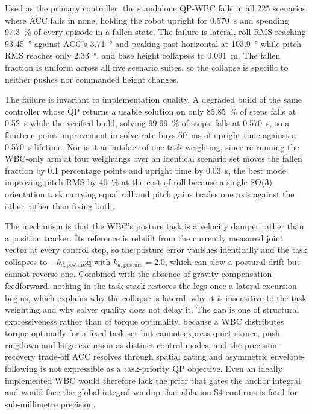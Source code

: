 \documentclass[a4paper,fleqn]{cas-dc}
\begin{document}
Used as the primary controller, the standalone QP-WBC falls in all \num{225}
scenarios where ACC falls in none, holding the robot upright for \SI{0.570}{s}
and spending \SI{97.3}{\percent} of every episode in a fallen state. The failure
is lateral, roll RMS reaching \SI{93.45}{\degree} against ACC's
\SI{3.71}{\degree} and peaking past horizontal at \SI{103.9}{\degree} while pitch
RMS reaches only \SI{2.33}{\degree}, and base height collapses to \SI{0.091}{m}.
The fallen fraction is uniform across all five scenario suites, so the collapse
is specific to neither pushes nor commanded height changes.

The failure is invariant to implementation quality. A degraded build of the same
controller whose QP returns a usable solution on only \SI{85.85}{\percent} of
steps falls at \SI{0.52}{s} while the verified build, solving
\SI{99.99}{\percent} of steps, falls at \SI{0.570}{s}, so a fourteen-point
improvement in solve rate buys \SI{50}{ms} of upright time against a
\SI{0.570}{s} lifetime. Nor is it an artifact of one task weighting, since
re-running the WBC-only arm at four weightings over an identical scenario set
moves the fallen fraction by \num{0.1} percentage points and upright time by
\SI{0.03}{s}, the best mode improving pitch RMS by \SI{40}{\percent} at the cost
of roll because a single SO(3) orientation task carrying equal roll and pitch
gains trades one axis against the other rather than fixing both.

The mechanism is that the WBC's posture task is a velocity damper rather than a
position tracker. Its reference is rebuilt from the currently measured joint
vector at every control step, so the posture error vanishes identically and the
task collapses to $-k_{d,\text{posture}}\dot{\mathbf{q}}$ with
$k_{d,\text{posture}}{=}2.0$, which can slow a postural drift but cannot reverse
one. Combined with the absence of gravity-compensation feedforward, nothing in
the task stack restores the legs once a lateral excursion begins, which explains
why the collapse is lateral, why it is insensitive to the task weighting and why
solver quality does not delay it. The gap is one of structural expressiveness
rather than of torque optimality, because a WBC distributes torque optimally for
a fixed task set but cannot express quiet stance, push ringdown and large
excursion as distinct control modes, and the precision--recovery trade-off ACC
resolves through spatial gating and asymmetric envelope-following is not
expressible as a task-priority QP objective. Even an ideally implemented WBC
would therefore lack the prior that gates the anchor integral and would face the
global-integral windup that ablation S4 confirms is fatal for sub-millimetre
precision.
\end{document}
